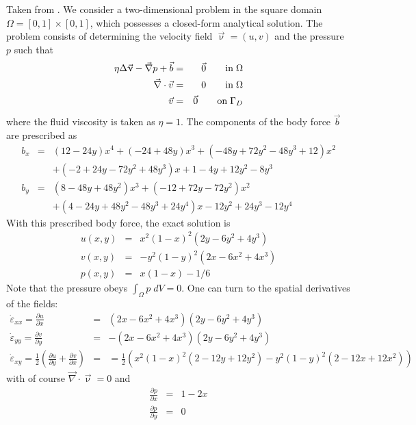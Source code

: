 Taken from \cite{dohu03}. We consider a two-dimensional problem 
in the square domain $\Omega=[0,1]\times[0,1]$, which possesses a closed-form analytical 
solution. The problem consists of determining the velocity field ${\vec \upnu} = (u,v)$ 
and the pressure $p$ such that 
\begin{eqnarray}
\eta \Delta {\vec \upnu} - {\vec \nabla} p + {\vec b} &=& \vec 0 \quad\quad {\rm in} \; \Omega\\
\vec{\nabla} \cdot \vec{v} &=& 0 \quad\quad {\rm in} \; \Omega\\
\vec{v}&=&\vec{0} \quad\quad {\rm on} \; \Gamma_D
\end{eqnarray}
where the fluid viscosity is taken as $\eta=1$.
The components of the body force $\vec{b}$ are prescribed as 
\begin{eqnarray}
b_x &=& (12 - 24y) x^4 + (-24 + 48y) x^3 + (-48y + 72y^2 - 48 y^3 + 12) x^2 \nonumber\\
    && + (-2 + 24y -72y^2+48y^3)x + 1-4y + 12y^2-8y^3 \nonumber\\ 
b_y &=& (8 - 48y + 48 y^2) x^3 + (-12 + 72y - 72y^2) x^2  \nonumber\\
    && + (4 - 24y + 48y^2 - 48y^3 + 24y^4) x - 12y^2 + 24y^3 - 12y^4  \nonumber
\end{eqnarray}
With this prescribed body force, the exact solution is 
\begin{eqnarray}
u(x,y) &=& x^2(1- x)^2 (2y - 6y^2 + 4y^3)  \nonumber\\
v(x,y) &=& -y^2 (1 - y)^2 (2x - 6x^2 + 4x^3) \nonumber\\
p(x,y) &=& x(1 -x)- 1/6 \nonumber 
\end{eqnarray}
Note that the pressure obeys $\int_{\Omega} p \; dV = 0$.
One can turn to the spatial derivatives of the fields:
\begin{eqnarray}
\dot{\varepsilon}_{xx}=\frac{\partial u}{\partial x} &=&  (2x -6x^2 +4 x^3 ) (2y - 6y^2 + 4y^3)  \\
\dot{\varepsilon}_{yy}=\frac{\partial v}{\partial y} &=&  - (2x -6x^2 +4 x^3 ) (2y - 6y^2 + 4y^3)  \\
\dot{\varepsilon}_{xy}=\frac{1}{2}\left(\frac{\partial u}{\partial y}+\frac{\partial v}{\partial x}\right) 
&=&=\frac{1}{2}\left( x^2(1- x)^2 ( 2-12y+12y^2  ) -y^2 (1-y)^2 (2-12x+12x^2) \right)
\end{eqnarray}
with of course  ${\vec \nabla} \cdot {\vec \upnu} = 0$ and 
\begin{eqnarray}
\frac{\partial p}{\partial x} &=& 1-2x  \\
\frac{\partial p}{\partial y} &=& 0
\end{eqnarray}

